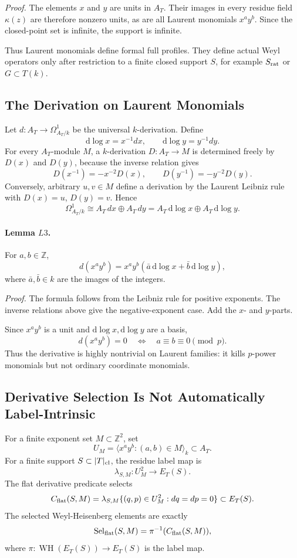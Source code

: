 \emph{Proof.}
The elements \(x\) and \(y\) are units in \(A_T\).  Their images in every
residue field \(\kappa(z)\) are therefore nonzero units, as are all Laurent
monomials \(x^ay^b\).  Since the closed-point set is infinite, the support is
infinite.

Thus Laurent monomials define formal full profiles.  They define actual Weyl
operators only after restriction to a finite closed support \(S\), for example
\(S_{\rm rat}\) or \(G\subset T(k)\).

\subsection{The Derivation on Laurent Monomials}

Let \(d:A_T\to\Omega^1_{A_T/k}\) be the universal \(k\)-derivation.  Define
\[
  \mathrm d\log x=x^{-1}dx,\qquad
  \mathrm d\log y=y^{-1}dy.
\]
For every \(A_T\)-module \(M\), a \(k\)-derivation \(D:A_T\to M\) is determined
freely by \(D(x)\) and \(D(y)\), because the inverse relation gives
\[
  D(x^{-1})=-x^{-2}D(x),\qquad D(y^{-1})=-y^{-2}D(y).
\]
Conversely, arbitrary \(u,v\in M\) define a derivation by the Laurent Leibniz
rule with \(D(x)=u\), \(D(y)=v\).  Hence
\[
  \Omega^1_{A_T/k}\cong A_T\,dx\oplus A_T\,dy
  =A_T\,\mathrm d\log x\oplus A_T\,\mathrm d\log y.
\]

\paragraph{Lemma \(L3\).}
For \(a,b\in\mathbb Z\),
\[
  d(x^ay^b)=x^ay^b(\bar a\,\mathrm d\log x+\bar b\,\mathrm d\log y),
\]
where \(\bar a,\bar b\in k\) are the images of the integers.

\emph{Proof.}
The formula follows from the Leibniz rule for positive exponents.  The inverse
relations above give the negative-exponent case.  Add the \(x\)- and
\(y\)-parts.

Since \(x^ay^b\) is a unit and \(\mathrm d\log x,\mathrm d\log y\) are a basis,
\[
  d(x^ay^b)=0\quad\Longleftrightarrow\quad
  a\equiv b\equiv0\pmod p.
\]
Thus the derivative is highly nontrivial on Laurent families: it kills
\(p\)-power monomials but not ordinary coordinate monomials.

\subsection{Derivative Selection Is Not Automatically Label-Intrinsic}

For a finite exponent set \(M\subset\mathbb Z^2\), set
\[
  U_M=\langle x^ay^b:(a,b)\in M\rangle_k\subset A_T.
\]
For a finite support \(S\subset |T|_{\rm cl}\), the residue label map is
\[
  \lambda_{S,M}:U_M^2\to E_T(S).
\]
The flat derivative predicate selects
\[
  C_{\rm flat}(S,M)=
  \lambda_{S,M}\{(q,p)\in U_M^2:dq=dp=0\}\subset E_T(S).
\]
The selected Weyl-Heisenberg elements are exactly
\[
  \operatorname{Sel}_{\rm flat}(S,M)=\pi^{-1}(C_{\rm flat}(S,M)),
\]
where \(\pi:\operatorname{WH}(E_T(S))\to E_T(S)\) is the label map.

